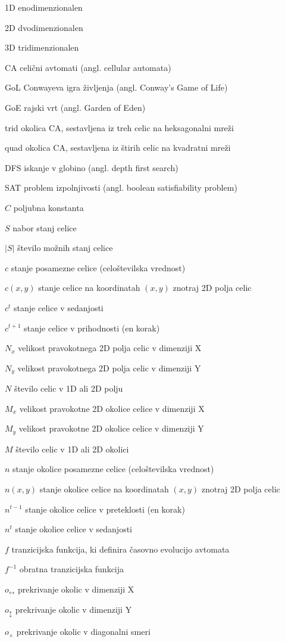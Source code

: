 \documentclass[12pt,a4paper,openany,twoside]{book}
\newcommand{\abbrlabel}[1]{\makebox[3cm][l]{\textbf{#1}\ \dotfill}}
\newenvironment{abbreviations}{\begin{list}{}{\renewcommand{\makelabel}{\abbrlabel}}}{\end{list}}
\begin{document}
\begin{abbreviations}
\item[1D] enodimenzionalen
\item[2D] dvodimenzionalen
\item[3D] tridimenzionalen
\item[CA] celični avtomati (angl. cellular automata)
\item[GoL] Conwayeva igra življenja (angl. Conway's Game of Life)
\item[GoE] rajski vrt (angl. Garden of Eden)
\item[trid] okolica CA, sestavljena iz treh celic na heksagonalni mreži
\item[quad] okolica CA, sestavljena iz štirih celic na kvadratni mreži
\item[DFS] iskanje v globino (angl. depth first search)
\item[SAT] problem izpolnjivosti (angl. boolean satisfiability problem)
\vspace{10mm}
\item[\(C\)] poljubna konstanta
\item[\(S\)] nabor stanj celice
\item[\(|S|\)] število možnih stanj celice
\item[\(c\)] stanje posamezne celice (celoštevilska vrednost)
\item[\(c(x,y)\)] stanje celice na koordinatah \((x,y)\) znotraj 2D polja celic
\item[\(c^t\)] stanje celice v sedanjosti
\item[\(c^{t+1}\)] stanje celice v prihodnosti (en korak)
\item[\(N_x\)] velikost pravokotnega 2D polja celic v dimenziji X
\item[\(N_y\)] velikost pravokotnega 2D polja celic v dimenziji Y
\item[\(N\)] število celic v 1D ali 2D polju
\item[\(M_x\)] velikost pravokotne 2D okolice celice v dimenziji X
\item[\(M_y\)] velikost pravokotne 2D okolice celice v dimenziji Y
\item[\(M\)] število celic v 1D ali 2D okolici
\item[\(n\)] stanje okolice posamezne celice (celoštevilska vrednost)
\item[\(n(x,y)\)] stanje okolice celice na koordinatah \((x,y)\) znotraj 2D polja celic
\item[\(n^{t-1}\)] stanje okolice celice v preteklosti (en korak)
\item[\(n^t\)] stanje okolice celice v sedanjosti
\item[\(f\)] tranzicijska funkcija, ki definira časovno evolucijo avtomata
\item[\(f^{-1}\)] obratna tranzicijska funkcija
\item[\(o_{\leftrightarrow}\)] prekrivanje okolic v dimenziji X
\item[\(o_{\updownarrow}\)] prekrivanje okolic v dimenziji Y
\item[\(o_{\times}\)] prekrivanje okolic v diagonalni smeri
\end{abbreviations}
\end{document}
